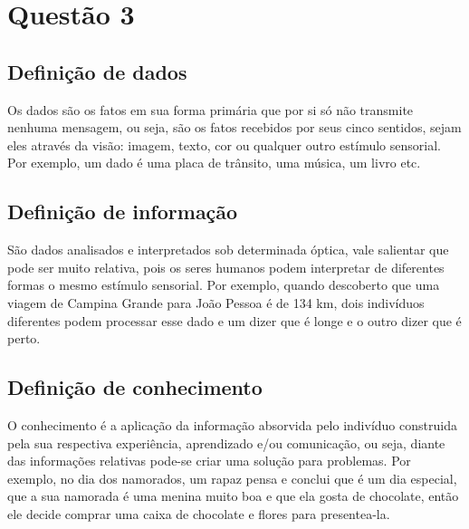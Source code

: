 \documentclass[a4paper,10pt]{article}
\begin{document}
\section{Questão 3}
\subsection{Definição de dados}
Os dados são os fatos em sua forma primária que por si só não transmite nenhuma mensagem, ou seja, são os fatos recebidos por seus cinco sentidos, sejam eles através da visão: imagem, texto, cor ou qualquer outro estímulo sensorial. Por exemplo, um dado é uma placa de trânsito, uma música, um livro etc.
\subsection{Definição de informação}
São dados analisados e interpretados sob determinada óptica, vale salientar que pode ser muito relativa, pois os seres humanos podem interpretar de diferentes formas o mesmo estímulo sensorial. Por exemplo, quando descoberto que uma viagem de Campina Grande para João Pessoa é de 134 km, dois indivíduos diferentes podem processar esse dado e um dizer que é longe e o outro dizer que é perto.
\subsection{Definição de conhecimento}
O conhecimento é a aplicação da informação absorvida pelo indivíduo construida pela sua respectiva experiência, aprendizado e/ou comunicação, ou seja, diante das informações relativas pode-se criar uma solução para problemas. Por exemplo,  no dia dos namorados, um rapaz pensa e conclui que é um dia especial, que a sua namorada é uma menina muito boa e que ela gosta de chocolate, então ele decide comprar uma caixa de chocolate e flores para presentea-la.
\end{document}
